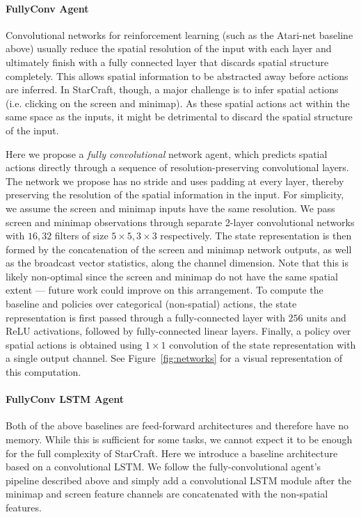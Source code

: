 \paragraph{FullyConv Agent} Convolutional networks for reinforcement learning (such as the Atari-net baseline above) usually reduce the spatial resolution of the input with each layer and ultimately finish with a fully connected layer that discards spatial structure completely. This allows spatial information to be abstracted away before actions are inferred. In StarCraft, though, a major challenge is to infer spatial actions (i.e. clicking on the screen and minimap). As these spatial actions act within the same space as the inputs, it might be detrimental to discard the spatial structure of the input.

Here we propose a \textit{fully convolutional} network agent, which predicts spatial actions directly through a sequence of resolution-preserving convolutional layers. The network we propose has no stride and uses padding at every layer, thereby preserving the resolution of the spatial information in the input. For simplicity, we assume the screen and minimap inputs have the same resolution. We pass screen and minimap observations through separate 2-layer convolutional networks with $16, 32$ filters of size $5 \times 5, 3 \times 3$ respectively. The state representation is then formed by the concatenation of the screen and minimap network outputs, as well as the broadcast vector statistics, along the channel dimension. Note that this is likely non-optimal since the screen and minimap do not have the same spatial extent --- future work could improve on this arrangement. To compute the baseline and policies over categorical (non-spatial) actions, the state representation is first passed through a fully-connected layer with $256$ units and $\textrm{ReLU}$ activations, followed by fully-connected linear layers. Finally, a policy over spatial actions is obtained using $1 \times 1$ convolution of the state representation with a single output channel. See Figure~\ref{fig:networks} for a visual representation of this computation.

\paragraph{FullyConv LSTM Agent} Both of the above baselines are feed-forward architectures and therefore have no memory. While this is sufficient for some tasks, we cannot expect it to be enough for the full complexity of StarCraft. Here we introduce a baseline architecture based on a convolutional LSTM. We follow the fully-convolutional agent's pipeline described above and simply add a convolutional LSTM module after the minimap and screen feature channels are concatenated with the non-spatial features.

